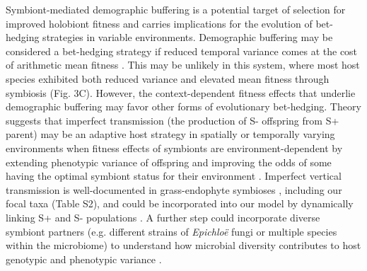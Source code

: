 \documentclass[lineno, sn-basic]{sn-jnl}%
\begin{document}
Symbiont-mediated demographic buffering is a potential target of selection for improved holobiont fitness \citep{vandenkoornhuyse2015importance} and carries implications for the evolution of bet-hedging strategies in variable environments. 
Demographic buffering may be considered a bet-hedging strategy if reduced temporal variance comes at the cost of arithmetic mean fitness \citep{childs2010evolutionary}. 
This may be unlikely in this system, where most host species exhibited both reduced variance and elevated mean fitness through symbiosis (Fig. 3C). 
However, the context-dependent fitness effects that underlie demographic buffering may favor other forms of evolutionary bet-hedging. 
Theory suggests that imperfect transmission (the production of S- offspring from S+ parent) may be an adaptive host strategy in spatially or temporally varying environments when fitness effects of symbionts are environment-dependent by extending phenotypic variance of offspring and improving the odds of some having the optimal symbiont status for their environment \citep{brown2019evolution,bruijning2022natural,lange2023impact}. 
Imperfect vertical transmission is well-documented in grass-endophyte symbioses \citep{afkhami2008symbiosis}, including our focal taxa (Table S2), and could be incorporated into our model by dynamically linking S+ and S- populations \citep{yule2013costs,chung2015fungal}.
A further step could incorporate diverse symbiont partners (e.g. different strains of \emph{Epichlo\"{e}} fungi or multiple species within the microbiome) to understand how microbial diversity contributes to host genotypic and phenotypic variance \citep{henry2021microbiome}.
\end{document}
